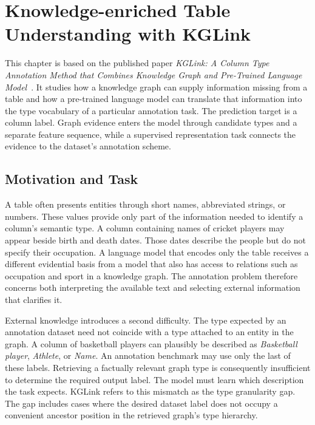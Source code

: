 \chapter{Knowledge-enriched Table Understanding with KGLink}
\label{ch:kglink}

This chapter is based on the published paper \emph{KGLink: A Column Type Annotation Method that Combines Knowledge Graph and Pre-Trained Language Model}~\cite{kglink-publication}. It studies how a knowledge graph can supply information missing from a table and how a pre-trained language model can translate that information into the type vocabulary of a particular annotation task. The prediction target is a column label. Graph evidence enters the model through candidate types and a separate feature sequence, while a supervised representation task connects the evidence to the dataset's annotation scheme.

\section{Motivation and Task}
\label{sec:kglink:motivation}

A table often presents entities through short names, abbreviated strings, or numbers. These values provide only part of the information needed to identify a column's semantic type. A column containing names of cricket players may appear beside birth and death dates. Those dates describe the people but do not specify their occupation. A language model that encodes only the table receives a different evidential basis from a model that also has access to relations such as occupation and sport in a knowledge graph. The annotation problem therefore concerns both interpreting the available text and selecting external information that clarifies it.

External knowledge introduces a second difficulty. The type expected by an annotation dataset need not coincide with a type attached to an entity in the graph. A column of basketball players can plausibly be described as \emph{Basketball player}, \emph{Athlete}, or \emph{Name}. An annotation benchmark may use only the last of these labels. Retrieving a factually relevant graph type is consequently insufficient to determine the required output label. The model must learn which description the task expects. KGLink refers to this mismatch as the type granularity gap. The gap includes cases where the desired dataset label does not occupy a convenient ancestor position in the retrieved graph's type hierarchy.

